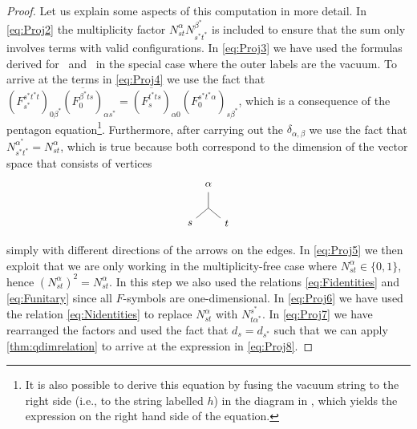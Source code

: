 \begin{proof}
	Let us explain some aspects of this computation in more detail. In \cref{eq:Proj2} the multiplicity factor $N_{st}^\alpha N_{s^*t^*}^{\beta^*}$ is included to ensure that the sum only involves terms with valid configurations. In \cref{eq:Proj3} we have used the formulas derived for \itemone\ and \itemfour\ in the special case where the outer labels are the vacuum. To arrive at the terms in \cref{eq:Proj4} we use the fact that $\left(F_{s^*}^{s^*t^*t}\right)_{0\beta^*}\overline{\left(F_0^{\beta^*ts}\right)}_{\alpha s^*}=\overline{\left(F_s^{t^*ts}\right)}_{\alpha 0} \left(F_0^{s^*t^*\alpha}\right)_{s\beta^*}$, which is a consequence of the pentagon equation\footnote{It is also possible to derive this equation by fusing the vacuum string to the right side (i.e., to the string labelled $h$) in the diagram in \itemone, which yields the expression on the right hand side of the equation.}. Furthermore, after carrying out the $\delta_{\alpha,\beta}$ we use the fact that $N_{s^*t^*}^{\alpha^*}=N_{st}^\alpha$, which is true because both correspond to the dimension of the vector space that consists of vertices
		\begin{equation}
			\begin{tikzpicture}
				\draw (90:0) -- (90:0.5);
				\draw (220:0) -- (220:0.5);
				\draw (320:0) -- (320:0.5);
				\node at (90:0.75) {\small $\alpha$};
				\node at (220:0.75) {\small $s$};
				\node at (320:0.75) {\small $t$};
			\end{tikzpicture}
		\end{equation}
	simply with different directions of the arrows on the edges. In \cref{eq:Proj5} we then exploit that we are only working in the multiplicity-free case where $N_{st}^\alpha\in\{0,1\}$, hence $(N_{st}^\alpha)^2=N_{st}^\alpha$. In this step we also used the relations \cref{eq:Fidentities} and \cref{eq:Funitary} since all $F$-symbols are one-dimensional. In \cref{eq:Proj6} we have used the relation \cref{eq:Nidentities} to replace $N_{st}^\alpha$ with $N_{t\alpha^*}^{s^*}$. In \cref{eq:Proj7} we have rearranged the factors and used the fact that $d_s=d_{s^*}$ such that we can apply \cref{thm:qdimrelation} to arrive at the expression in \cref{eq:Proj8}.
\end{proof}

